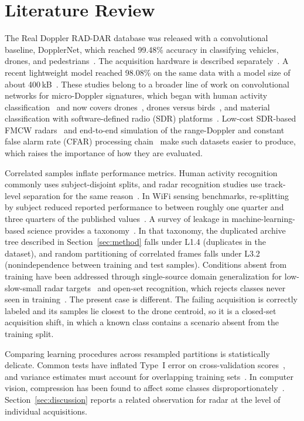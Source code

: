 \documentclass[conference]{IEEEtran}
\begin{document}
\section{Literature Review}
\label{sec:related}

The Real Doppler RAD-DAR database was released with a convolutional baseline, DopplerNet, which reached 99.48\% accuracy in classifying vehicles, drones, and pedestrians~\cite{roldan2020}. The acquisition hardware is described separately~\cite{quevedo2019}. A recent lightweight model reached 98.08\% on the same data with a model size of about 400\,kB~\cite{zhang2025}. These studies belong to a broader line of work on convolutional networks for micro-Doppler signatures, which began with human activity classification~\cite{kim2016} and now covers drones~\cite{ahmad2024}, drones versus birds~\cite{mustafa2026}, and material classification with software-defined radio (SDR) platforms~\cite{liaquat2025imm}. Low-cost SDR-based FMCW radars~\cite{tariq2024} and end-to-end simulation of the range-Doppler and constant false alarm rate (CFAR) processing chain~\cite{liaquat2024tut} make such datasets easier to produce, which raises the importance of how they are evaluated.

Correlated samples inflate performance metrics. Human activity recognition commonly uses subject-disjoint splits, and radar recognition studies use track-level separation for the same reason~\cite{buchman2022}. In WiFi sensing benchmarks, re-splitting by subject reduced reported performance to between roughly one quarter and three quarters of the published values~\cite{varga2024a,varga2024b}. A survey of leakage in machine-learning-based science provides a taxonomy~\cite{kapoor2023}. In that taxonomy, the duplicated archive tree described in Section~\ref{sec:method} falls under L1.4 (duplicates in the dataset), and random partitioning of correlated frames falls under L3.2 (nonindependence between training and test samples). Conditions absent from training have been addressed through single-source domain generalization for low-slow-small radar targets~\cite{chen2025} and open-set recognition, which rejects classes never seen in training~\cite{bai2026}. The present case is different. The failing acquisition is correctly labeled and its samples lie closest to the drone centroid, so it is a closed-set acquisition shift, in which a known class contains a scenario absent from the training split.

Comparing learning procedures across resampled partitions is statistically delicate. Common tests have inflated Type~I error on cross-validation scores~\cite{dietterich1998}, and variance estimates must account for overlapping training sets~\cite{nadeau2003}. In computer vision, compression has been found to affect some classes disproportionately~\cite{hooker2019,tran2022}. Section~\ref{sec:discussion} reports a related observation for radar at the level of individual acquisitions.
\end{document}

